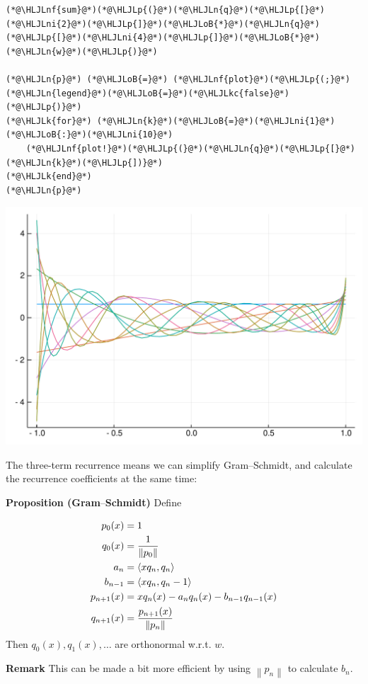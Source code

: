 \documentclass[12pt,a4paper]{article}
\newcommand{\HLJLk}[1]{\textcolor[RGB]{148,91,176}{\textbf{#1}}}
\newcommand{\HLJLkc}[1]{\textcolor[RGB]{59,151,46}{\textit{#1}}}
\newcommand{\HLJLn}[1]{#1}
\newcommand{\HLJLnf}[1]{\textcolor[RGB]{66,102,213}{#1}}
\newcommand{\HLJLni}[1]{\textcolor[RGB]{59,151,46}{#1}}
\newcommand{\HLJLoB}[1]{\textcolor[RGB]{102,102,102}{\textbf{#1}}}
\newcommand{\HLJLp}[1]{#1}
\def\ip<#1>{\left\langle{#1}\right\rangle}
\def\norm#1{\left\| #1 \right\|}
\def\endash{–}
\begin{document}
\begin{lstlisting}
(*@\HLJLnf{sum}@*)(*@\HLJLp{(}@*)(*@\HLJLn{q}@*)(*@\HLJLp{[}@*)(*@\HLJLni{2}@*)(*@\HLJLp{]}@*)(*@\HLJLoB{*}@*)(*@\HLJLn{q}@*)(*@\HLJLp{[}@*)(*@\HLJLni{4}@*)(*@\HLJLp{]}@*)(*@\HLJLoB{*}@*)(*@\HLJLn{w}@*)(*@\HLJLp{)}@*)

(*@\HLJLn{p}@*) (*@\HLJLoB{=}@*) (*@\HLJLnf{plot}@*)(*@\HLJLp{(;}@*) (*@\HLJLn{legend}@*)(*@\HLJLoB{=}@*)(*@\HLJLkc{false}@*)(*@\HLJLp{)}@*)
(*@\HLJLk{for}@*) (*@\HLJLn{k}@*)(*@\HLJLoB{=}@*)(*@\HLJLni{1}@*)(*@\HLJLoB{:}@*)(*@\HLJLni{10}@*)
    (*@\HLJLnf{plot!}@*)(*@\HLJLp{(}@*)(*@\HLJLn{q}@*)(*@\HLJLp{[}@*)(*@\HLJLn{k}@*)(*@\HLJLp{])}@*)
(*@\HLJLk{end}@*)
(*@\HLJLn{p}@*)
\end{lstlisting}

\includegraphics[width=\linewidth]{figures/Lecture20_1_1.pdf}

The three-term recurrence means we can simplify Gram\ensuremath{\endash}Schmidt, and calculate the recurrence coefficients at the same time:

\textbf{Proposition (Gram\ensuremath{\endash}Schmidt)} Define


\begin{align*}
p_0(x) &= 1 \\
q_0(x) &= {1 \over \norm{p_0}}\\
a_n &= \ip<x q_n, q_n> \\
b_{n-1} &= \ip<x q_n, q_{n-1}>\\
p_{n+1}(x) &= x q_n(x) -  a_n q_n(x) -  b_{n-1} q_{n-1}(x)\\
q_{n+1}(x) &= {p_{n+1}(x) \over \norm{p_n}}
\end{align*}
Then $q_0(x), q_1(x), \ldots$ are orthonormal w.r.t. $w$.

\textbf{Remark} This can be made a bit more efficient by using $\norm{p_n}$ to calculate $b_n$.
\end{document}
